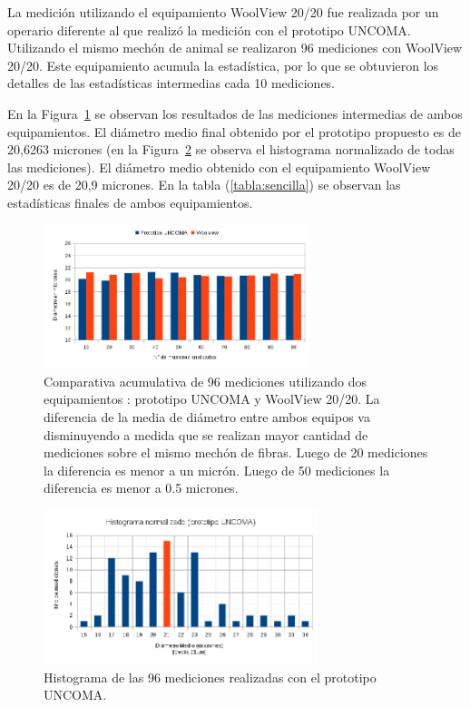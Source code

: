 \documentclass[runningheads,a4paper]{llncs}
\begin{document}
La medición utilizando el equipamiento WoolView 20/20 fue realizada por un operario diferente al que realizó la medición con el prototipo UNCOMA. Utilizando el mismo mechón de animal se realizaron 96 mediciones con WoolView 20/20. Este equipamiento acumula la estadística, por lo que se obtuvieron los detalles de las estadísticas intermedias cada 10 mediciones. 

En la Figura~\ref{fig:prototipovswv} se observan los resultados de las mediciones intermedias de ambos equipamientos.
El diámetro medio final obtenido por el prototipo propuesto es de 20,6263 micrones (en la Figura~\ref{fig:histograma} se observa el histograma normalizado de todas las mediciones). El diámetro medio obtenido con el equipamiento WoolView 20/20 es de 20,9 micrones. En la tabla (\ref{tabla:sencilla}) se observan las estadísticas finales de ambos equipamientos.

\begin{figure}
\centering
\includegraphics[height=4.2cm]{prototipovswv}
\caption{\small Comparativa acumulativa de 96 mediciones utilizando dos equipamientos : prototipo UNCOMA y WoolView 20/20.
La diferencia de la media de diámetro entre ambos equipos va disminuyendo a medida que se realizan mayor cantidad de mediciones sobre el mismo mechón de fibras. Luego de 20 mediciones la diferencia es menor a un micrón. Luego de 50 mediciones la diferencia es menor a 0.5 micrones.}
\label{fig:prototipovswv}
\end{figure}

\begin{figure}
\centering
\includegraphics[height=4.5cm]{histograma}
\caption{Histograma de las 96 mediciones realizadas con el prototipo UNCOMA.}
\label{fig:histograma}
\end{figure}
\end{document}
